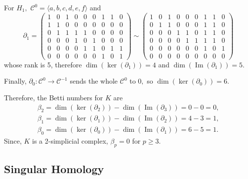 \documentclass[
	fontsize=10pt, %
	twoside=false, %
	secnumdepth=1, %
]{kaobook}
\DeclareMathOperator{\im}{Im}
\begin{document}
\begin{example}
    For $H_1,$ $\mathcal{C}^0=\langle a,b,c,d,e,f\rangle$ and $$\partial_1=\left(\begin{array}{ccccccccc} 
    1 & 0 & 1 & 0 & 0 & 0 & 1 & 1 & 0 \\
    1 & 1 & 0 & 0 & 0 & 0 & 0 & 0 & 0 \\
    0 & 1 & 1 & 1 & 1 & 0 & 0 & 0 & 0 \\
    0 & 0 & 0 & 1 & 0 & 1 & 0 & 0 & 0 \\
    0 & 0 & 0 & 0 & 1 & 1 & 0 & 1 & 1 \\
    0 & 0 & 0 & 0 & 0 & 0 & 1 & 0 & 1
    \end{array}\right)\sim \left(\begin{array}{ccccccccc} 
    1 & 0 & 1 & 0 & 0 & 0 & 1 & 1 & 0 \\
    0 & 1 & 1 & 0 & 0 & 0 & 1 & 1 & 0 \\
    0 & 0 & 0 & 1 & 1 & 0 & 1 & 1 & 0 \\
    0 & 0 & 0 & 0 & 1 & 1 & 1 & 1 & 0 \\
    0 & 0 & 0 & 0 & 0 & 0 & 1 & 0 & 1 \\
    0 & 0 & 0 & 0 & 0 & 0 & 0 & 0 & 0
    \end{array}\right)$$ whose rank is 5, therefore $\dim(\ker(\partial_1))=4$ and $\dim(\im(\partial_1))=5.$

    Finally, $\partial_0:\mathcal{C}^0\to\mathcal{C}^{-1}$ sends the whole $\mathcal{C}^0$ to $0,$ so $\dim(\ker(\partial_0))=6.$

    Therefore, the Betti numbers for $K$ are 
    \begin{eqnarray*}
        \beta_2 = \dim(\ker(\partial_2))-\dim(\im(\partial_3))=0-0=0, \\
        \beta_1 = \dim(\ker(\partial_1))-\dim(\im(\partial_2))=4-3=1,\\
        \beta_0 = \dim(\ker(\partial_0))-\dim(\im(\partial_1))=6-5=1.
    \end{eqnarray*}
    Since, $K$ is a 2-simplicial complex, $\beta_p=0$ for $p\geq 3.$
\end{example}

\subsection{Singular Homology}



%
%
%


\end{document}
